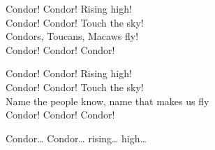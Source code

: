 \begin{lyrics}
Condor! Condor! Rising high!\\
Condor! Condor! Touch the sky!\\
Condors, Toucans, Macaws fly!\\
Condor! Condor! Condor!

Condor! Condor! Rising high!\\
Condor! Condor! Touch the sky!\\
Name the people know, name that makes us fly\\
Condor! Condor! Condor!

Condor… Condor… rising… high…
\end{lyrics}

